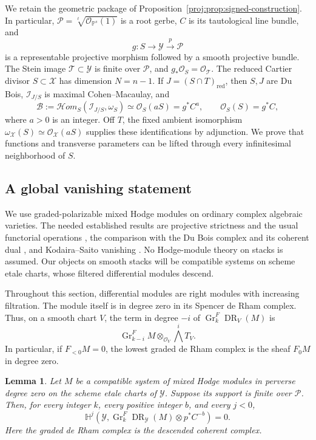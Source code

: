 \documentclass[11pt,letterpaper]{article}
\newcommand{\PP}{\mathbb{P}}
\newcommand{\OO}{\mathcal{O}}
\DeclareMathOperator{\Gr}{Gr}
\DeclareMathOperator{\DR}{DR}
\newtheorem{lemma}[theorem]{Lemma}
\theoremstyle{definition}
\theoremstyle{remark}
\begin{document}
We retain the geometric package of
Proposition~\ref{proj:prop:signed-construction}.  In particular,
\(\mathcal P=\sqrt[\ell]{\OO_{\PP^s}(1)}\) is a root gerbe, \(C\) is
its tautological line bundle, and
\[
 g:S\longrightarrow\mathcal Y
 \xrightarrow{p}\mathcal P
\]
is a representable projective morphism followed by a smooth projective
bundle.  The Stein image \(\mathcal T\subset\mathcal Y\) is finite over
\(\mathcal P\), and \(g_*\OO_S=\OO_{\mathcal T}\).  The reduced Cartier
divisor \(S\subset\mathcal X\) has dimension \(N=n-1\).  If
\(J=(S\cap T)_{\mathrm{red}}\), then \(S,J\) are Du Bois,
\(\mathcal I_{J/S}\) is maximal Cohen--Macaulay, and
\begin{equation}\label{proj:hg:geometric-lines}
 \mathcal B:=
 \mathcal Hom_S(\mathcal I_{J/S},\omega_S)
 \simeq \OO_S(aS)=g^*C^a,
 \qquad
 \OO_S(S)=g^*C,
\end{equation}
where \(a>0\) is an integer.  Off \(T\), the fixed ambient isomorphism
\(\omega_{\mathcal X}(S)\simeq\OO_{\mathcal X}(aS)\) supplies these
identifications by adjunction.  We prove that functions and transverse
parameters can be lifted through every infinitesimal neighborhood of
\(S\).

\subsection{A global vanishing statement}

We use graded-polarizable mixed Hodge modules on ordinary complex
algebraic varieties.  The needed established results are projective
strictness and the usual functorial operations
\cite[Theorem~2.14 and Section~4]{Proj-Saito1990}, the comparison with the
Du Bois complex and its coherent dual
\cite[Theorem~0.2 and Corollary~0.3]{Proj-Saito2000}, and
Kodaira--Saito vanishing \cite[Proposition~2.33]{Proj-Saito1990}.
No Hodge-module theory on stacks is assumed.  Our objects on smooth
stacks will be compatible systems on scheme etale charts, whose
filtered differential modules descend.

Throughout this section, differential modules are right modules with
increasing filtration.  The module itself is in degree zero in its
Spencer de Rham complex.  Thus, on a smooth chart \(V\), the term in
degree \(-i\) of \(\Gr^F_k\DR_V(M)\) is
\[
 \Gr^F_{k-i}M\otimes_{\OO_V}\bigwedge^iT_V.
\]
In particular, if \(F_{<0}M=0\), the lowest graded de Rham complex is
the sheaf \(F_0M\) in degree zero.

\begin{lemma}\label{proj:hg:negative-vanishing}
Let \(M\) be a compatible system of mixed Hodge modules in perverse
degree zero on the scheme etale charts of \(\mathcal Y\).  Suppose
its support is finite over \(\mathcal P\).  Then, for every integer
\(k\), every positive integer \(b\), and every \(j<0\),
\[
 \mathbb H^j\!\left(
   \mathcal Y,\Gr^F_k\DR_{\mathcal Y}(M)\otimes p^*C^{-b}
 \right)=0.
\]
Here the graded de Rham complex is the descended coherent complex.
\end{lemma}
\end{document}
